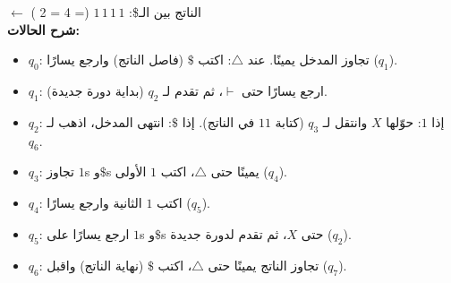 \documentclass[14pt]{extarticle}
\begin{document}
$\leftarrow$ الناتج بين الـ\$: $1\,1\,1\,1$ (= 4 = 2 ) \checkmark \\
\clearpage
\textbf{شرح الحالات:}
\begin{itemize}
    \item $q_0$: تجاوز المدخل يمينًا. عند $\triangle$: اكتب $\$$ (فاصل الناتج) وارجع يسارًا ($q_1$).
    \item $q_1$: ارجع يسارًا حتى $\vdash$، ثم تقدم لـ $q_2$ (بداية دورة جديدة).
    \item $q_2$: إذا $1$: حوّلها $X$ وانتقل لـ $q_3$ (كتابة $11$ في الناتج). إذا $\$$: انتهى المدخل، اذهب لـ $q_6$.
    \item $q_3$: تجاوز $1$s و$\$$s يمينًا حتى $\triangle$، اكتب $1$ الأولى ($q_4$).
    \item $q_4$: اكتب $1$ الثانية وارجع يسارًا ($q_5$).
    \item $q_5$: ارجع يسارًا على $1$s و$\$$s حتى $X$، ثم تقدم لدورة جديدة ($q_2$).
    \item $q_6$: تجاوز الناتج يمينًا حتى $\triangle$، اكتب $\$$ (نهاية الناتج) واقبل ($q_7$).
\end{itemize}
\end{document}
